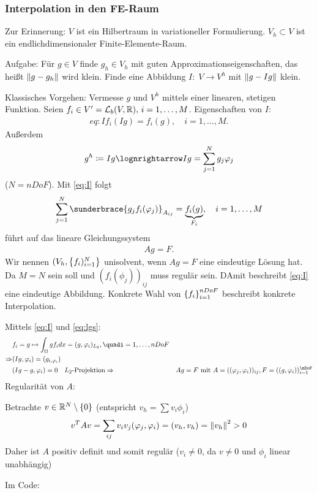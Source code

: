 \subsubsection{Interpolation in den FE-Raum}
Zur Erinnerung: $V$ ist ein Hilbertraum in variationeller Formulierung. $V_{h} \subset V$ ist ein endlichdimensionaler Finite-Elemente-Raum. 

Aufgabe: Für $g \in V$ finde $g_{h} \in V_{h}$ mit guten Approximationseigenschaften, das heißt $\left \|g - g_{h} \right\|$ wird klein. Finde eine Abbildung $I: \; V \to V^{h}$ mit $\left \|g - Ig \right\|$ klein.

Klassisches Vorgehen: Vermesse $g$ und $V^{h}$ mittels einer linearen, stetigen Funktion. Seien $f_{i} \in V' = {\cal L}_{b}(V, \mathbb{R}), \, i = 1, \dots, M$. Eigenschaften von $I$:
\begin{align}{eq:I}
  f_{i}(Ig) = f_{i}(g), \quad i = 1, \dots, M.
\end{align}
Außerdem
\begin{align*}
  g^{h}\coloneqq Ig \lognrightarrow Ig = \sum_{j = 1}^{N}g_{j}\phi_{j} 
\end{align*}
($N = nDoF$). Mit \eqref{eq:I} folgt
\begin{align*}
  \sum_{j=1}^{N} \sunderbrace{g_{j}f_{i}(\phi_{j})}_{{A_{ij}}} = \underbrace{f_{i}(g)}_{F_{i}}, \quad i = 1, \dots, M
\end{align*}
führt auf das lineare Gleichungssystem 
\begin{align}\label{eq:lgs}
  A g = F.
\end{align}
Wir nennen $(V_{h}, \left\{ f_{i})_{i = 1}^{N} \right\}$ unisolvent, wenn $Ag = F$ eine eindeutige Lösung hat. Da $M = N$ sein soll und $(f_{i}(\phi_{j}))_{ij}$ muss regulär sein. DAmit beschreibt \eqref{eq:I} eine eindeutige Abbildung. Konkrete Wahl von $\left\{ f_{i} \right\}_{i = 1}^{nDoF}$ beschreibt konkrete Interpolation. 
\begin{beispiel}
Mittels \eqref{eq:I} und \eqref{eq:lgs}:
  \begin{align*}
&    f_{i} = g \mapsto \int_{\O}g f_{i}dx = (g, \phi_{i})_{L_{2}}, \quadi = 1, \dots, nDoF\\
\Rightarrow & (Ig, \phi_{i}) = (g_{i, \phi_{i}})\\
&(Ig - g, \phi_{i}) = 0 \quad L_{2}\text{-Projektion}
\Rightarrow& Ag = F \text{ mit } A = ((\phi_{j}, \phi_{i}))_{ij}, F = ((g, \phi_{i}))_{i = 1}^{\nDoF}
\end{align*}
Regularität von $A$:

Betrachte $v \in \mathbb{R}^{N}\setminus\left\{ 0 \right\}$ (entspricht  $v_{h} = \sum v_{i} \phi_{i}$)
\begin{align*}
  v^{T}Av = \sum_{ij} v_{i}v_{j}(\varphi_{j}, \varphi_{i}) = (v_{h}, v_{h}) = \left \|v_{h} \right\|^{2} > 0
\end{align*}
Daher ist $A$ positiv definit und somit regulär ($v_{i} \neq 0$, da $v \neq 0$ und $\phi_{i}$ linear unabhängig)
\end{beispiel}
Im Code:

